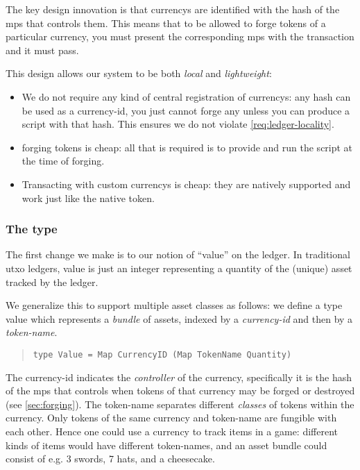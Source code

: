The key design innovation is that \glspl{currency} are identified with the hash of the \gls{mps} that controls them.
This means that to be allowed to forge \glspl{token} of a particular \gls{currency}, you must present the corresponding \gls{mps} with the transaction and it must pass.

This design allows our system to be both \emph{local} and \emph{lightweight}:
\begin{itemize}
\item
  We do not require any kind of central registration of \glspl{currency}: any hash can be used as a \gls{currency-id}, you just cannot forge any unless you can produce a \gls{script} with that hash.
  This ensures we do not violate \cref{req:ledger-locality}.
\item
  \Gls{forging} \glspl{token} is cheap: all that is required is to provide and run the script at the time of forging.
\item
  Transacting with custom \glspl{currency} is cheap: they are natively supported and work just like the native token.
\end{itemize}


\subsubsection{The  type}
\label{sec:value}
The first change we make is to our notion of ``value'' on the ledger.
In traditional \gls{utxo} ledgers, value is just an integer representing a quantity of the (unique) asset tracked by the ledger.

We generalize this to support multiple asset classes as follows: we define a type \gls{value} which represents a \emph{bundle} of assets, indexed by a \emph{\gls{currency-id}} and then by a \emph{\gls{token-name}}.

\begin{quote}
\begin{verbatim}
type Value = Map CurrencyID (Map TokenName Quantity)
\end{verbatim}
\end{quote}

The \gls{currency-id} indicates the \emph{controller} of the currency, specifically it is the hash of the \gls{mps} that controls when tokens of that currency may be forged or destroyed (see \cref{sec:forging}).
The \gls{token-name} separates different \emph{classes} of \gls{token}s within the currency. Only \glspl{token} of the same currency and \gls{token-name} are \gls{fungible} with each other.
Hence one could use a currency to track items in a game: different kinds of items would have different \glspl{token-name}, and an asset bundle could consist of e.g. 3 swords, 7 hats, and a cheesecake.

